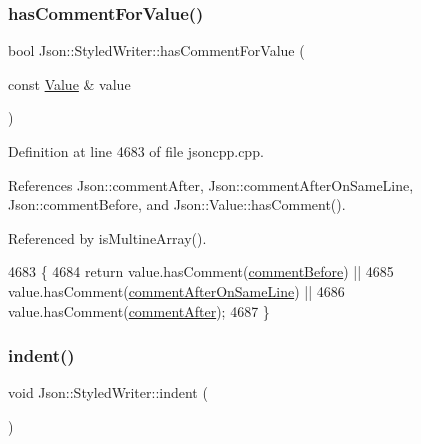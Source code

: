 \subsubsection{\texorpdfstring{has\+Comment\+For\+Value()}{hasCommentForValue()}}
{\footnotesize\ttfamily bool Json\+::\+Styled\+Writer\+::has\+Comment\+For\+Value (\begin{DoxyParamCaption}\item[{const \hyperlink{class_json_1_1_value}{Value} \&}]{value }\end{DoxyParamCaption})\hspace{0.3cm}{\ttfamily [private]}}



Definition at line 4683 of file jsoncpp.\+cpp.



References Json\+::comment\+After, Json\+::comment\+After\+On\+Same\+Line, Json\+::comment\+Before, and Json\+::\+Value\+::has\+Comment().



Referenced by is\+Multine\+Array().


\begin{DoxyCode}
4683                                                         \{
4684   \textcolor{keywordflow}{return} value.hasComment(\hyperlink{namespace_json_a4fc417c23905b2ae9e2c47d197a45351a52f1733775460517b2ea6bedf4906d52}{commentBefore}) ||
4685          value.hasComment(\hyperlink{namespace_json_a4fc417c23905b2ae9e2c47d197a45351a008a230a0586de54f30b76afe70fdcfa}{commentAfterOnSameLine}) ||
4686          value.hasComment(\hyperlink{namespace_json_a4fc417c23905b2ae9e2c47d197a45351ac5784ca53b12250888ddb642b06aebef}{commentAfter});
4687 \}
\end{DoxyCode}
\mbox{\label{class_json_1_1_styled_writer_a0b65be6186a7c6638270990265e42b97}} 
\subsubsection{\texorpdfstring{indent()}{indent()}}
{\footnotesize\ttfamily void Json\+::\+Styled\+Writer\+::indent (\begin{DoxyParamCaption}{ }\end{DoxyParamCaption})\hspace{0.3cm}{\ttfamily [private]}}



